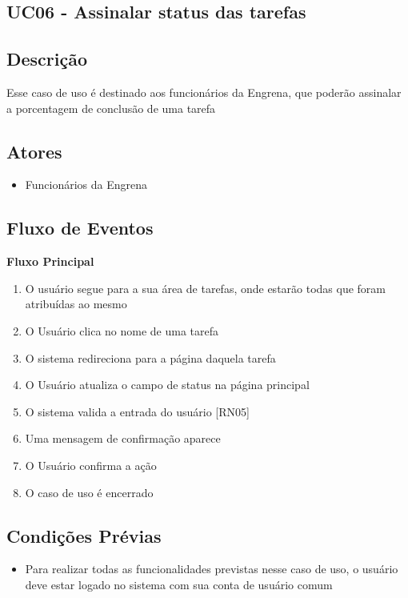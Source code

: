 \begin{apendicesenv}
\section{UC06 - Assinalar status das tarefas}

\subsection{Descrição}

Esse caso de uso é destinado aos funcionários da Engrena, que poderão assinalar a porcentagem de conclusão de uma tarefa

\subsection{Atores}

\begin{itemize}
  \item{Funcionários da Engrena}
\end{itemize}

\subsection{Fluxo de Eventos}

\textbf{Fluxo Principal}

\begin{enumerate}
  \item{O usuário segue para a sua área de tarefas, onde estarão todas que foram atribuídas ao mesmo}
  \item{O Usuário clica no nome de uma tarefa}
  \item{O sistema redireciona para a página daquela tarefa}
  \item{O Usuário atualiza o campo de status na página principal}
  \item{O sistema valida a entrada do usuário [RN05]}
  \item{Uma mensagem de confirmação aparece}
  \item{O Usuário confirma a ação}
  \item{O caso de uso é encerrado}
\end{enumerate}

\subsection{Condições Prévias}
\begin{itemize}
\item{Para realizar todas as funcionalidades previstas nesse caso de uso, o usuário deve estar logado no sistema com sua conta de usuário comum}
\end{itemize}


\end{apendicesenv}
